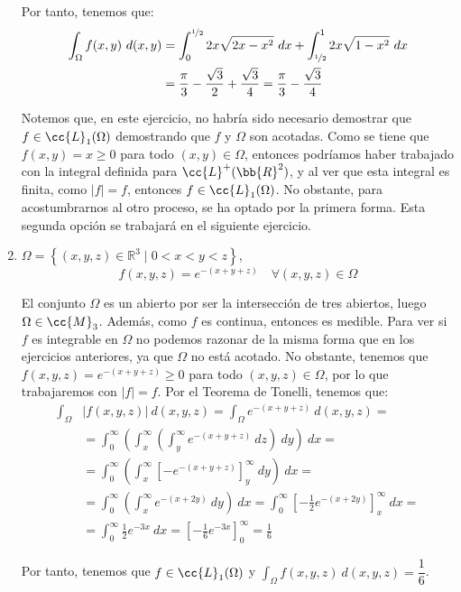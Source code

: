\begin{ejercicio}
\begin{enumerate}
        Por tanto, tenemos que:
        \begin{align*}
            \int_{\Omega} f(x, y)~d(x, y)
            &= \int_{0}^{\nicefrac{1}{2}} 2x\sqrt{2x-x^2}~dx + \int_{\nicefrac{1}{2}}^{1} 2x\sqrt{1-x^2}~dx \\
            &= \frac{\pi}{3}-\frac{\sqrt{3}}{2} + \frac{\sqrt{3}}{4} = \frac{\pi}{3}-\frac{\sqrt{3}}{4}
        \end{align*}

        \begin{observacion}
            Notemos que, en este ejercicio, no habría sido necesario demostrar que $f\in \cc{L}_1(\Omega)$ demostrando
            que $f$ y $\Omega$ son acotadas. Como se tiene que $f(x,y)=x\geq 0$ para todo $(x,y)\in \Omega$, entonces
            podríamos haber trabajado con la integral definida para $\cc{L}^+(\bb{R}^2)$, y al ver que
            esta integral es finita, como $|f|=f$, entonces $f\in \cc{L}_1(\Omega)$.
            No obstante, para acostumbrarnos al otro proceso, se ha optado por la primera forma. Esta segunda opción se trabajará en el siguiente ejercicio.
        \end{observacion}

        \item \(\Omega = \left\{ (x, y, z) \in \mathbb{R}^3 \mid 0 < x < y < z \right\} \),
        \[ f(x, y, z) = e^{-(x+y+z)} \quad \forall (x, y, z) \in \Omega \]

        El conjunto $\Omega$ es un abierto por ser la intersección de tres abiertos, luego $\Omega\in \cc{M}_3$. Además, como $f$ es continua, entonces
        es medible. Para ver si $f$ es integrable en $\Omega$ no podemos razonar de la misma forma que
        en los ejercicios anteriores, ya que $\Omega$ no está acotado. No obstante, tenemos que
        $f(x,y,z)=e^{-(x+y+z)}\geq 0$ para todo $(x,y,z)\in \Omega$, por lo que trabajaremos con $|f|=f$.
        Por el Teorema de Tonelli, tenemos que:
        \begin{align*}
            \int_{\Omega} &|f(x, y, z)|~d(x, y, z)
            = \int_{\Omega} e^{-(x+y+z)}~d(x, y, z)
            =\\&= \int_{0}^{\infty} \left( \int_{x}^{\infty} \left( \int_{y}^{\infty} e^{-(x+y+z)}~dz \right)~dy \right)~dx
            =\\&= \int_{0}^{\infty} \left( \int_{x}^{\infty} \left[ -e^{-(x+y+z)} \right]_{y}^{\infty}~dy \right)~dx
            =\\&= \int_{0}^{\infty} \left( \int_{x}^{\infty} e^{-(x+2y)}~dy \right)~dx
            = \int_{0}^{\infty} \left[ -\frac{1}{2}e^{-(x+2y)} \right]_{x}^{\infty}~dx
            =\\&= \int_{0}^{\infty} \frac{1}{2}e^{-3x} ~dx
            = \left[ -\frac{1}{6}e^{-3x} \right]_{0}^{\infty}
            = \frac{1}{6}
        \end{align*}

        Por tanto, tenemos que $f\in \cc{L}_1(\Omega)$ y $\displaystyle \int_{\Omega} f(x, y, z)~d(x, y, z) = \dfrac{1}{6}$.

    \end{enumerate}

\end{ejercicio}

